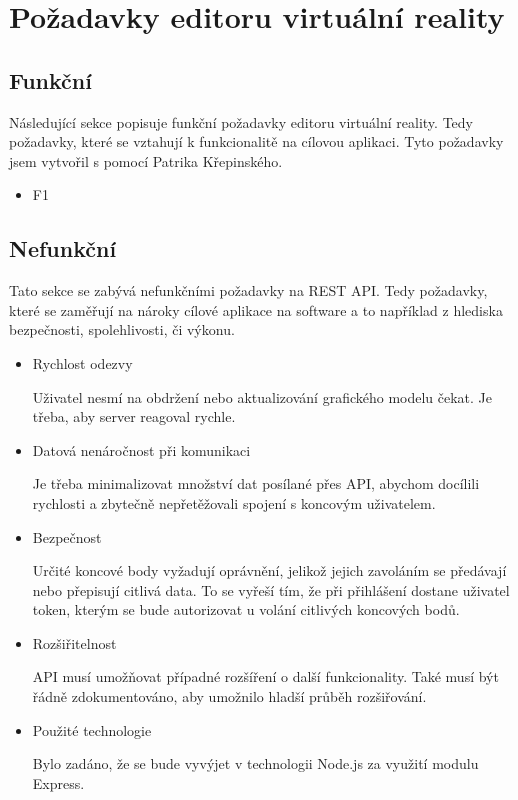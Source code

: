 \documentclass[thesis=B,czech]{FITthesis}[2012/06/26]
\begin{document}
    \section{Požadavky editoru virtuální reality}
        \subsection{Funkční}
            Následující sekce popisuje funkční požadavky editoru virtuální reality. Tedy požadavky, které se vztahují k funkcionalitě na cílovou aplikaci. Tyto požadavky jsem vytvořil s pomocí Patrika Křepinského.
            \begin{itemize}
                \item F1
            \end{itemize}

        \subsection{Nefunkční}
            Tato sekce se zabývá nefunkčními požadavky na REST API. Tedy požadavky, které se zaměřují na nároky cílové aplikace na software a to například z hlediska bezpečnosti, spolehlivosti, či výkonu.
            \begin{itemize}
                \item Rychlost odezvy

                    Uživatel nesmí na obdržení nebo aktualizování grafického modelu čekat. Je třeba, aby server reagoval rychle.
                \item Datová nenáročnost při komunikaci

                    Je třeba minimalizovat množství dat posílané přes API, abychom docílili rychlosti a zbytečně nepřetěžovali spojení s koncovým uživatelem.
                \item Bezpečnost
                    
                    Určité koncové body vyžadují oprávnění, jelikož jejich zavoláním se předávají nebo přepisují citlivá data. To se vyřeší tím, že při přihlášení dostane uživatel token, kterým se bude autorizovat u volání citlivých koncových bodů.
                \item Rozšiřitelnost

                    API musí umožňovat případné rozšíření o další funkcionality. Také musí být řádně zdokumentováno, aby umožnilo hladší průběh rozšiřování.
                \item Použité technologie

                    Bylo zadáno, že se bude vyvýjet v technologii Node.js za využití modulu Express.
            \end{itemize}
\end{document}
